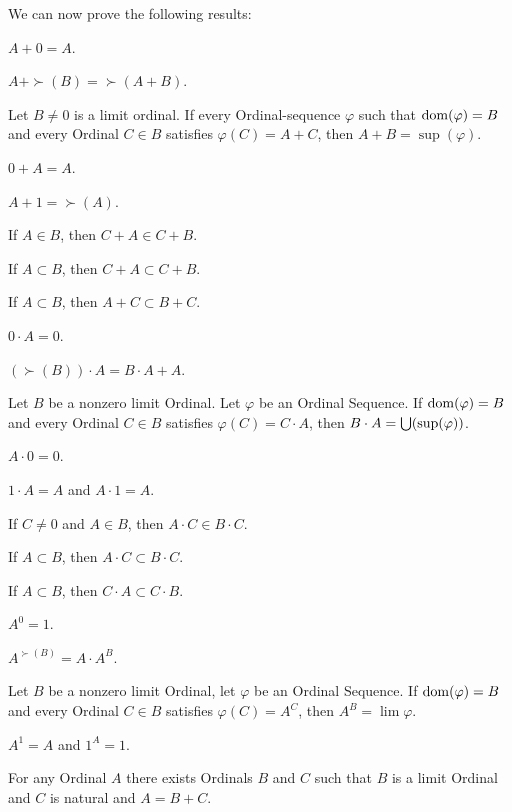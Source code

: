 \documentclass{article}
\begin{document}
We can now prove the following results:
\begin{thm}
\item\label{ordinal2:27} $A+0=A$.
\item\label{ordinal2:28} $A+\succ(B)=\succ(A+B)$.
\item\label{ordinal2:29} Let $B\neq0$ is a limit ordinal. If every
  Ordinal-sequence $\varphi$ such that $\operatorname{dom}(\varphi)=B$ and every
  Ordinal $C\in B$ satisfies $\varphi(C)=A+C$,
  then $A+B=\sup(\varphi)$.
\item\label{ordinal2:30} $0+A=A$.
\item\label{ordinal2:31} $A+1=\succ(A)$.
\item\label{ordinal2:32} If $A\in B$, then $C+A\in C+B$.
\item\label{ordinal2:33} If $A\subset B$, then $C+A\subset C+B$.
\item\label{ordinal2:34} If $A\subset B$, then $A+C\subset B+C$.
\item\label{ordinal2:35} $0\cdot A=0$.
\item\label{ordinal2:36} $(\succ(B))\cdot A=B\cdot A+A$.
\item\label{ordinal2:37} Let $B$ be a nonzero limit Ordinal.
  Let $\varphi$ be an Ordinal Sequence. If $\operatorname{dom}(\varphi)=B$ and every
  Ordinal $C\in B$ satisfies $\varphi(C)=C\cdot A$, then $B\cdot A=\bigcup(\sup(\varphi))$.
\item\label{ordinal2:38} $A\cdot 0=0$.
\item\label{ordinal2:39} $1\cdot A=A$ and $A\cdot 1=A$.
\item\label{ordinal2:40} If $C\neq0$ and $A\in B$, then $A\cdot C\in B\cdot C$.
\item\label{ordinal2:41} If $A\subset B$, then $A\cdot C\subset B\cdot C$.
\item\label{ordinal2:42} If $A\subset B$, then $C\cdot A\subset C\cdot B$.
\item\label{ordinal2:43} $A^{0}=1$.
\item\label{ordinal2:44} $A^{\succ(B)}=A\cdot A^{B}$.
\item\label{ordinal2:45} Let $B$ be a nonzero limit Ordinal, let
  $\varphi$ be an Ordinal Sequence. If $\operatorname{dom}(\varphi)=B$ and every
  Ordinal $C\in B$ satisfies $\varphi(C)=A^{C}$, then $A^{B}=\lim\varphi$.
\item\label{ordinal2:46} $A^{1}=A$ and $1^{A}=1$.
\item\label{ordinal2:47} For any Ordinal $A$ there exists Ordinals $B$
  and $C$ such that $B$ is a limit Ordinal and $C$ is natural and $A=B+C$.
\end{thm}
\end{document}
